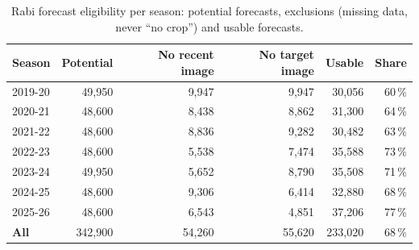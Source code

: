 \begin{table}[H]
\centering
\caption{Rabi forecast eligibility per season: potential forecasts, exclusions (missing data, never ``no crop'') and usable forecasts.}
\label{tab:r_elig}
\footnotesize
\begin{tabular}{@{}lrrrrr@{}}
\toprule
\textbf{Season} & \textbf{Potential} & \textbf{No recent image} & \textbf{No target image} & \textbf{Usable} & \textbf{Share} \\
\midrule
2019-20 & 49,950 & 9,947 & 9,947 & 30,056 & 60\,\% \\
2020-21 & 48,600 & 8,438 & 8,862 & 31,300 & 64\,\% \\
2021-22 & 48,600 & 8,836 & 9,282 & 30,482 & 63\,\% \\
2022-23 & 48,600 & 5,538 & 7,474 & 35,588 & 73\,\% \\
2023-24 & 49,950 & 5,652 & 8,790 & 35,508 & 71\,\% \\
2024-25 & 48,600 & 9,306 & 6,414 & 32,880 & 68\,\% \\
2025-26 & 48,600 & 6,543 & 4,851 & 37,206 & 77\,\% \\
\textbf{All} & 342,900 & 54,260 & 55,620 & 233,020 & 68\,\% \\
\bottomrule
\end{tabular}
\end{table}
